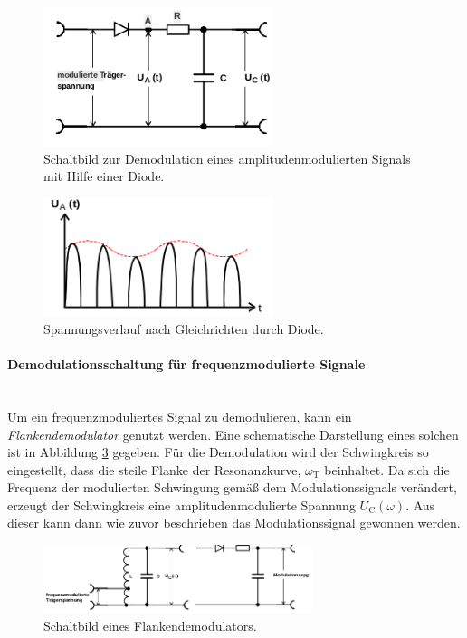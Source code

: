 \begin{figure}
  \centering
  \includegraphics[width=0.6\textwidth]{figures/gleichrichterdiode.PNG}
  \caption{Schaltbild zur Demodulation eines amplitudenmodulierten Signals mit Hilfe einer Diode.\cite{sample}}
  \label{fig:8}
\end{figure}

\begin{figure}
\centering
\includegraphics[width=0.6\textwidth]{figures/spannung_diode.PNG}
\caption{Spannungsverlauf nach Gleichrichten durch Diode.\cite{sample}}
\label{fig:gleichgerichtet}
\end{figure}

\FloatBarrier

\paragraph{Demodulationsschaltung für frequenzmodulierte Signale}
\mbox{}\\
Um ein frequenzmoduliertes Signal zu demodulieren, kann ein
\textit{Flankendemodulator} genutzt werden.
Eine schematische Darstellung eines solchen ist in Abbildung \ref{fig:11}
gegeben. Für die Demodulation wird der Schwingkreis so eingestellt, dass
die steile Flanke der Resonanzkurve, $\omega_{\text{T}}$ beinhaltet.
Da sich die Frequenz der modulierten Schwingung gemäß dem Modulationssignals
verändert, erzeugt der Schwingkreis eine amplitudenmodulierte Spannung
$U_{\text{C}}(\omega)$. Aus dieser kann dann wie zuvor beschrieben das
Modulationssignal gewonnen werden.

\begin{figure}
\centering
\includegraphics[width=0.7\textwidth]{figures/flankenmodulator.PNG}
\caption{Schaltbild eines Flankendemodulators.\cite{sample}}
\label{fig:11}
\end{figure}
